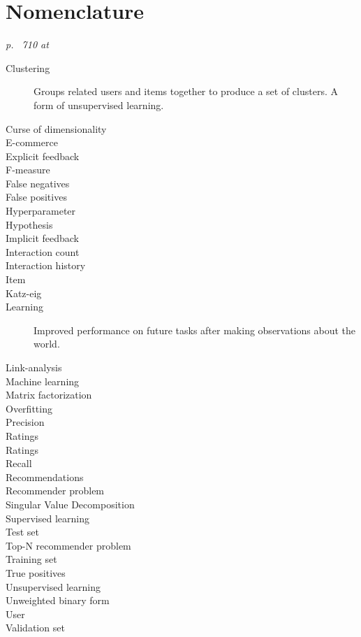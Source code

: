 \chapter{Nomenclature}\label{cha:def}

\textit{p. ~710 at \citep{norvigAI}}

\begin{description}
    \item[Clustering] Groups related users and items together to produce a set of clusters. A form of unsupervised learning.
    \item[Curse of dimensionality]
    \item[E-commerce]
    \item[Explicit feedback]
    \item[F-measure]
    \item[False negatives]
    \item[False positives]
    \item[Hyperparameter]
    \item[Hypothesis]
    \item[Implicit feedback]
    \item[Interaction count]
    \item[Interaction history]
    \item[Item]
    \item[Katz-eig]
    \item[Learning] Improved performance on future tasks after making observations about the world.
    \item[Link-analysis]
    \item[Machine learning]
    \item[Matrix factorization]
    \item[Overfitting]
    \item[Precision]
    \item[Ratings]
    \item[Ratings]
    \item[Recall]
    \item[Recommendations]
    \item[Recommender problem]
    \item[Singular Value Decomposition]
    \item[Supervised learning]
    \item[Test set]
    \item[Top-N recommender problem]
    \item[Training set]
    \item[True positives]
    \item[Unsupervised learning]
    \item[Unweighted binary form]
    \item[User]
    \item[Validation set]
\end{description}

